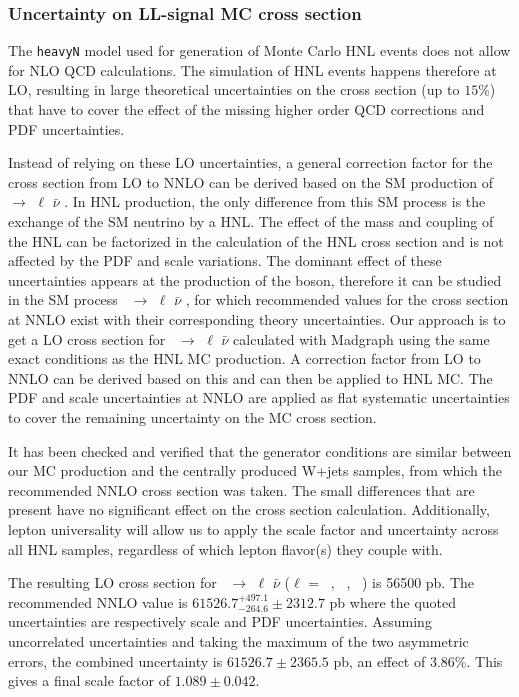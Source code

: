 \subsubsection{Uncertainty on LL-signal MC cross section}\label{sec:c4lo}
The \texttt{heavyN} model used for generation of Monte Carlo HNL events does not allow for NLO QCD calculations. The simulation of HNL events happens therefore at LO, resulting in large theoretical uncertainties on the cross section (up to $15\%$) that have to cover the effect of the missing higher order QCD corrections and PDF uncertainties.

Instead of relying on these LO uncertainties, a general correction factor for the cross section from LO to NNLO can be derived based on the SM production of \PW\ $\rightarrow$ $\ell$ $\bar{\nu}$ . In HNL production, the only difference from this SM process is the exchange of the SM neutrino by a HNL. The effect of the mass and coupling of the HNL can be factorized in the calculation of the HNL cross section and is not affected by the PDF and scale variations. The dominant effect of these uncertainties appears at the production of the \PW boson, therefore it can be studied in the SM process \PW\ $\rightarrow$ $\ell$ $\bar{\nu}$ , for which recommended values for the cross section at NNLO exist with their corresponding theory uncertainties. Our approach is to get a LO cross section for \PW\ $\rightarrow$ $\ell$ $\bar{\nu}$ calculated with Madgraph using the same exact conditions as the HNL MC production. A correction factor from LO to NNLO can be derived based on this and can then be applied to HNL MC. The PDF and scale uncertainties at NNLO are applied as flat systematic uncertainties to cover the remaining uncertainty on the MC cross section.

It has been checked and verified that the generator conditions are similar between our MC production and the centrally produced W+jets samples, from which the recommended NNLO cross section was taken. The small differences that are present have no significant effect on the cross section calculation. Additionally, lepton universality will allow us to apply the scale factor and uncertainty across all HNL samples, regardless of which lepton flavor(s) they couple with.

The resulting LO cross section for \PW\ $\rightarrow$ $\ell$
$\bar{\nu}$ ($\ell$ = \Pe\ , \PGm\ , \PGt\ ) is 56500 pb. The recommended NNLO value is $61526.7^{+497.1}_{-264.6}\pm 2312.7$ pb where the quoted uncertainties are respectively scale and PDF uncertainties. Assuming uncorrelated uncertainties and taking the maximum of the two asymmetric errors, the combined uncertainty is $61526.7 \pm 2365.5$ pb, an effect of $3.86\%$. This gives a final scale factor of $1.089 \pm 0.042$.

